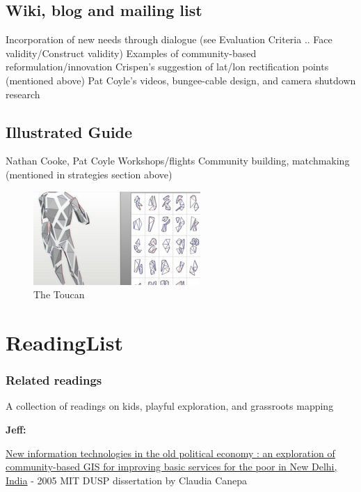 \documentclass[11pt]{report}
\begin{document}
\section{Wiki, blog and mailing list}
        Incorporation of new needs through dialogue (see Evaluation Criteria .. Face validity/Construct validity)
        Examples of community-based reformulation/innovation
            Crispen's suggestion of lat/lon rectification points (mentioned above)
            Pat Coyle's videos, bungee-cable design, and camera shutdown research

\section{Illustrated Guide}
        Nathan Cooke, Pat Coyle
    Workshops/flights
    Community building, matchmaking (mentioned in strategies section above)



\begin{figure}[h]
  \begin{center}
    \includegraphics[scale=0.75]{images/test.jpg}
    \caption{The Toucan}
  \end{center}
\end{figure}

\chapter{ReadingList}

\hypertarget{related_readings_1}{}\subsection*{{Related readings}}\label{related_readings_1}

A collection of readings on kids, playful exploration, and grassroots mapping

\textbf{Jeff:}

\href{http://dspace.mit.edu/handle/1721.1/33012}{New information technologies in the old political economy : an exploration of community-based GIS for improving basic services for the poor in New Delhi, India} - 2005 MIT DUSP dissertation by Claudia Canepa
\end{document}
